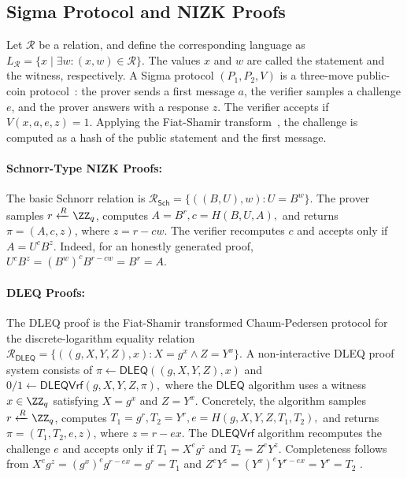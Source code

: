 \documentclass[runningheads]{llncs}
\newcommand{\dleq}{\mathsf{DLEQ}}
\newcommand{\dleqVrf}{\mathsf{DLEQVrf}}
\begin{document}
\subsection{Sigma Protocol and NIZK Proofs}
\label{sec:sigma_protocol}


Let \(\mathcal{R}\) be a relation, and define the corresponding language as \(L_\mathcal{R}=\{x\mid \exists w:(x,w)\in\mathcal{R}\}\). The values \(x\) and \(w\) are called the statement and the witness, respectively. A Sigma protocol \((P_1,P_2,V)\) is a three-move public-coin protocol~\cite{damgaard2002sigma}: the prover sends a first message \(a\), the verifier samples a challenge \(e\), and the prover answers with a response \(z\). The verifier accepts if \(V(x,a,e,z)=1\). Applying the Fiat-Shamir transform~\cite{fiat1986prove}, the challenge is computed as a hash of the public statement and the first message. 

\paragraph{\textbf{Schnorr-Type NIZK Proofs:}}\label{par:dex_proof_system_assumptions}
The basic Schnorr relation is
$
\mathcal{R}_{\mathsf{Sch}}
=\{((B,U),w): U=B^w\}.
$
The prover samples \(r\xleftarrow{R}\ZZ_q\), computes
$A=B^r, c=H(B,U,A),$
and returns \(\pi=(A,c,z)\), where \(z=r-cw\). The verifier recomputes \(c\) and accepts only if
$A = U^c B^z .$
Indeed, for an honestly generated proof,
$U^cB^z=(B^w)^cB^{r-cw}=B^r=A.$

\paragraph{\textbf{DLEQ Proofs:}}
The DLEQ proof is the Fiat-Shamir transformed Chaum-Pedersen protocol for the discrete-logarithm equality relation~\cite{Chaum1992DLEQ}
$\mathcal{R}_{\mathsf{DLEQ}}
=\{((g,X,Y,Z),x): X=g^x \land Z=Y^x\}.$
A non-interactive DLEQ proof system consists of
$\pi\gets \dleq((g,X,Y,Z),x)$ and $0/1\gets \dleqVrf(g,X,Y,Z,\pi),$
where the $\dleq$ algorithm uses a witness \(x\in\ZZ_q\) satisfying \(X=g^x\) and \(Z=Y^x\).
Concretely, the algorithm samples \(r\xleftarrow{R}\ZZ_q\), computes
$T_1=g^r, T_2=Y^r, e=H(g,X,Y,Z,T_1,T_2),$
and returns \(\pi=(T_1,T_2,e,z)\), where \(z=r-ex\). The $\dleqVrf$ algorithm recomputes the challenge \(e\) and accepts only if
$T_1 = X^e g^z$ and $T_2 = Z^e Y^z .$
Completeness follows from
$X^eg^z=(g^x)^eg^{r-ex}=g^r=T_1$ and $Z^eY^z=(Y^x)^eY^{r-ex}=Y^r=T_2$ .
\end{document}
